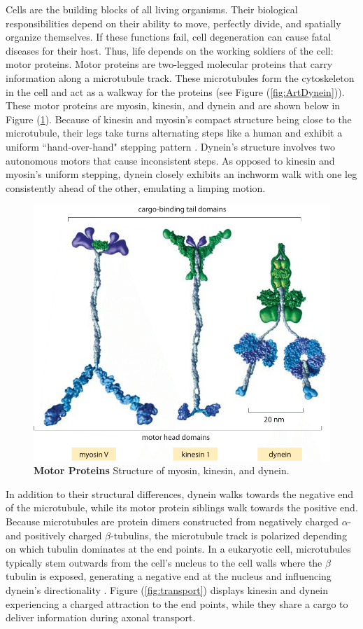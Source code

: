 Cells are the building blocks of all living organisms. Their biological responsibilities depend on their ability to move, perfectly divide, and spatially organize themselves. If these functions fail, cell degeneration can cause fatal diseases for their host. Thus, life depends on the working soldiers of the cell: motor proteins. Motor proteins are two-legged molecular proteins that carry information along a microtubule track. These microtubules form the cytoskeleton in the cell and act as a walkway for the proteins (see Figure (\ref{fig:ArtDynein})). These motor proteins are myosin, kinesin, and dynein and are shown below in Figure (\ref{fig:Compare}). Because of kinesin and myosin's compact structure being close to the microtubule, their legs take turns alternating steps like a human and exhibit a uniform ``hand-over-hand" stepping pattern \cite{fehr2008kinesin}. Dynein's structure involves two autonomous motors that cause inconsistent steps. As opposed to kinesin and myosin's uniform stepping, dynein closely exhibits an inchworm walk with one leg consistently ahead of the other, emulating a limping motion.

\begin{figure}[H]
	\centering
	\includegraphics[width=0.4\columnwidth]{Figures/motor_comparison.png}
	\caption[Motor Proteins]{\textbf{Motor Proteins} Structure of myosin, kinesin, and dynein. \cite{RonArt}}
	\label{fig:Compare}
\end{figure}

In addition to their structural differences, dynein walks towards the negative end of the microtubule, while its motor protein siblings walk towards the positive end. Because microtubules are protein dimers constructed from negatively charged $\alpha$- and positively charged $\beta$-tubulins, the microtubule track is polarized depending on which tubulin dominates at the end points. In a eukaryotic cell, microtubules typically stem outwards from the cell's nucleus to the cell walls where the $\beta$ tubulin is exposed, generating a negative end at the nucleus and influencing dynein's directionality \cite{paschal1987retrograde}. Figure (\ref{fig:transport}) displays kinesin and dynein experiencing a charged attraction to the end points, while they share a cargo to deliver information during axonal transport. 

